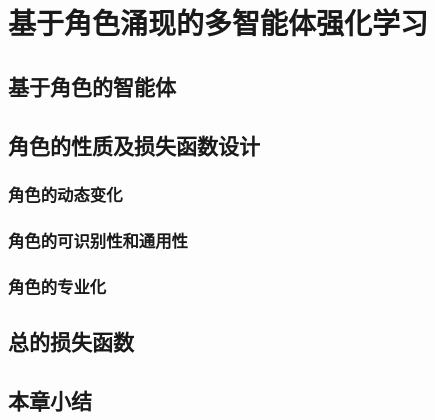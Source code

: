 
\chapter{基于角色涌现的多智能体强化学习}
\section{基于角色的智能体}

\section{角色的性质及损失函数设计}
\subsection{角色的动态变化}

\subsection{角色的可识别性和通用性}

\subsection{角色的专业化}

\section{总的损失函数}

\section{本章小结}

